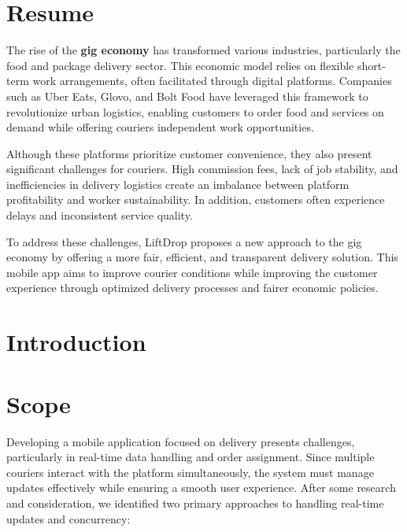 \documentclass[a4paper,twoside,11pt]{article}
\begin{document}
\section{Resume}
The rise of the \textbf{gig economy} has transformed various industries, particularly the food and package delivery sector. This economic model relies on flexible short-term work arrangements, often facilitated through digital platforms. Companies such as Uber Eats, Glovo, and Bolt Food have leveraged this framework to revolutionize urban logistics, enabling customers to order food and services on demand while offering couriers independent work opportunities.

\vspace{5mm}

Although these platforms prioritize customer convenience, they also present significant challenges for couriers. High commission fees, lack of job stability, and inefficiencies in delivery logistics create an imbalance between platform profitability and worker sustainability. In addition, customers often experience delays and inconsistent service quality.

\vspace{5mm}

To address these challenges, LiftDrop proposes a new approach to the gig economy by offering a more fair, efficient, and transparent delivery solution. This mobile app aims to improve courier conditions while improving the customer experience through optimized delivery processes and fairer economic policies.

\newpage

\section{Introduction}

\newpage

\section{Scope}

Developing a mobile application focused on delivery presents challenges, particularly in real-time data handling and order assignment. Since multiple couriers interact with the platform simultaneously, the system must manage updates effectively while ensuring a smooth user experience. After some research and consideration, we identified two primary approaches to handling real-time updates and concurrency:
\end{document}
